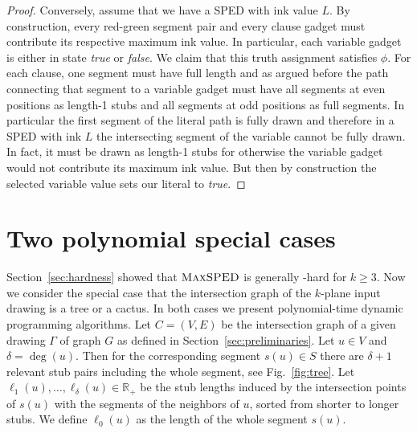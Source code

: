 \documentclass[a4paper,english,numberwithinsect]{eurocg18}
\newcommand{\maxsped}{\ensuremath{\textsc{MaxSPED}}\xspace}
\begin{document}
\begin{proof}
	Conversely, assume that we have a SPED with ink value $L$. 
	By construction, every red-green segment pair and every clause gadget must contribute its respective maximum ink value.
	In particular, each variable gadget is either in state \emph{true} or \emph{false}.
	We claim that this truth assignment satisfies $\phi$.
	For each clause, one segment must have full length and as argued before the path connecting that segment to a variable gadget must have all segments at even positions as length-1 stubs and all segments at odd positions as full segments. 
	In particular the first segment of the literal path is fully drawn and therefore in a SPED with ink $L$ the intersecting segment of the variable cannot be fully drawn.
	In fact, it must be drawn as length-1 stubs for otherwise the variable gadget would not contribute its maximum ink value.
	But then by construction the selected variable value sets our literal to \emph{true}.	
\end{proof}

\section{Two polynomial special cases}


Section~\ref{sec:hardness} showed that \maxsped is generally \NP-hard for $k \ge 3$. 
Now we consider the special case that the intersection graph of the $k$-plane input drawing is a tree or a cactus. In both cases we present polynomial-time dynamic programming algorithms. Let $ C = (V,E) $ be the intersection graph of a given drawing $\Gamma$ of graph $ G $ as defined in Section~\ref{sec:preliminaries}. 
Let $ u \in V $ and $ \delta  = \deg(u) $. 
Then for the corresponding segment $ s(u) \in S $ there are $ \delta + 1 $ relevant stub pairs including the whole segment, see Fig.~\ref{fig:tree}. 
Let $ \ell_1(u), \dots, \ell_\delta(u) \in \mathbb{R}_+$ be the stub lengths induced by the intersection points of $s(u)$ with the segments of the neighbors of $u$,  sorted from shorter to longer stubs. We define  $ \ell_0(u) $ as the length of the whole segment $ s(u) $. 
\end{document}
